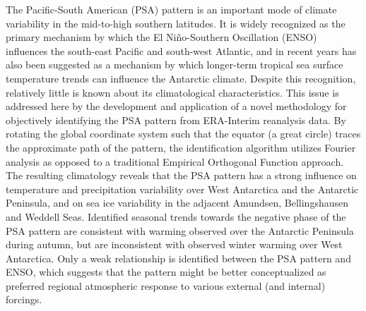 The Pacific-South American (PSA) pattern is an important mode of climate variability in the mid-to-high southern latitudes. It is widely recognized as the primary mechanism by which the El Ni\~{n}o-Southern Oscillation (ENSO) influences the south-east Pacific and south-west Atlantic, and in recent years has also been suggested as a mechanism by which longer-term tropical sea surface temperature trends can influence the Antarctic climate. Despite this recognition, relatively little is known about its climatological characteristics. This issue is addressed here by the development and application of a novel methodology for objectively identifying the PSA pattern from ERA-Interim reanalysis data. By rotating the global coordinate system such that the equator (a great circle) traces the approximate path of the pattern, the identification algorithm utilizes Fourier analysis as opposed to a traditional Empirical Orthogonal Function approach. The resulting climatology reveals that the PSA pattern has a strong influence on temperature and precipitation variability over West Antarctica and the Antarctic Peninsula, and on sea ice variability in the adjacent Amundsen, Bellingshausen and Weddell Seas. Identified seasonal trends towards the negative phase of the PSA pattern are consistent with warming observed over the Antarctic Peninsula during autumn, but are inconsistent with observed winter warming over West Antarctica. Only a weak relationship is identified between the PSA pattern and ENSO, which suggests that the pattern might be better conceptualized as preferred regional atmospheric response to various external (and internal) forcings.